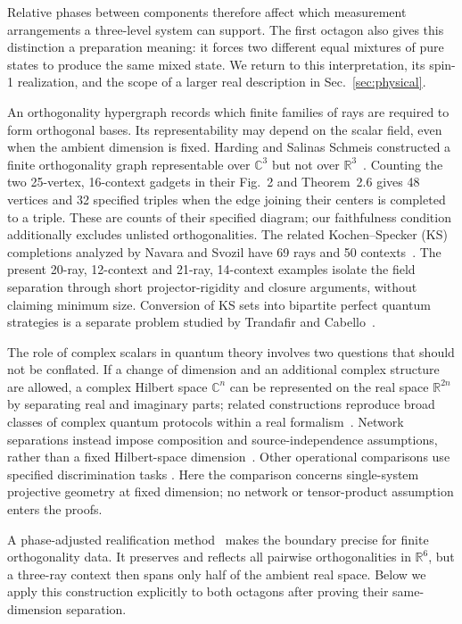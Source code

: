 \documentclass[twocolumn,aps,pra,floatfix,amsmath,amssymb,longbibliography]{revtex4-2}
\theoremstyle{definition}
\theoremstyle{remark}
\newcommand{\C}{\mathbb C}
\newcommand{\R}{\mathbb R}
\begin{document}
Relative phases between components therefore affect which measurement
arrangements a three-level system can support.  The first octagon also gives this
distinction a preparation meaning: it forces two different equal mixtures
of pure states to produce the same mixed state.  We return to this
interpretation, its spin-1 realization, and the scope of a larger real
description in Sec.~\ref{sec:physical}.

An orthogonality hypergraph records which finite families of rays are required
to form orthogonal bases.  Its representability may depend on the scalar field,
even when the ambient dimension is fixed.  Harding and Salinas Schmeis
constructed a finite orthogonality graph representable over $\C^3$ but not
over $\R^3$~\cite{harding2025remarksIJTP}.  Counting the two 25-vertex,
16-context gadgets in their Fig.~2 and Theorem~2.6 gives 48 vertices and
32 specified triples when the edge joining their centers is completed to
a triple.  These are counts of their specified diagram; our faithfulness
condition additionally excludes unlisted orthogonalities.  The related
Kochen--Specker (KS) completions analyzed by Navara and Svozil have 69 rays
and 50 contexts~\cite{svozil-2025-MYOCHS}.  The present 20-ray, 12-context
and 21-ray, 14-context examples isolate the field separation through short
projector-rigidity and closure arguments, without claiming minimum size.
Conversion of KS sets into bipartite perfect quantum strategies is a
separate problem studied by Trandafir and Cabello~\cite{2024-cabello-trandafir0}.

The role of complex scalars in quantum theory involves two questions that
should not be conflated.  If a change of dimension and an additional complex
structure are allowed, a complex Hilbert space $\C^n$ can be represented on
the real space $\R^{2n}$ by separating real and imaginary parts; related
constructions reproduce broad classes of complex quantum protocols within a
real formalism~\cite{Hardy2012LimitedHolism,Aleksandrova2013UniversalQubit,
McKague2009SimulatingRealHilbert}.  Network separations instead impose
composition and source-independence assumptions, rather than a fixed
Hilbert-space dimension~\cite{renou-2021,Weilenmann2025PartialIndependencePRL}.
Other operational comparisons use specified discrimination tasks
\cite{Bednorz2022OptimalDiscrimination}.  Here the comparison concerns
single-system projective geometry at fixed dimension; no network or
tensor-product assumption enters the proofs.

A phase-adjusted realification method~\cite{svozil-2025-rvc} makes the boundary precise for finite
orthogonality data.  It preserves and reflects all pairwise orthogonalities in
$\R^6$, but a three-ray context then spans only half of the ambient real
space.  Below we apply this construction explicitly to both octagons after
proving their same-dimension separation.
\end{document}
